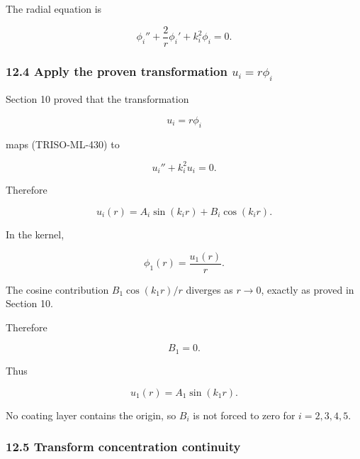 \documentclass[11pt,a4paper]{article}
\begin{document}
The radial equation is

\begin{equation}
\boxed{
\phi_i''
+\frac2r\phi_i'
+k_i^2\phi_i
=
0.
}
\tag{TRISO-ML-430}
\label{eq:triso-ml-430}
\end{equation}

\subsubsection*{12.4 Apply the proven transformation $u_i=r\phi_i$}

Section 10 proved that the transformation

\begin{equation}
u_i=r\phi_i
\tag{TRISO-ML-431}
\label{eq:triso-ml-431}
\end{equation}

maps (TRISO-ML-430) to

\begin{equation}
\boxed{
u_i''+k_i^2u_i=0.
}
\tag{TRISO-ML-432}
\label{eq:triso-ml-432}
\end{equation}

Therefore

\begin{equation}
\boxed{
u_i(r)
=
A_i\sin(k_ir)+B_i\cos(k_ir).
}
\tag{TRISO-ML-433}
\label{eq:triso-ml-433}
\end{equation}

In the kernel,

\begin{equation}
\phi_1(r)=\frac{u_1(r)}{r}.
\tag{TRISO-ML-434}
\label{eq:triso-ml-434}
\end{equation}

The cosine contribution $B_1\cos(k_1r)/r$ diverges as $r\to0$, exactly as proved in Section 10.

Therefore

\begin{equation}
\boxed{
B_1=0.
}
\tag{TRISO-ML-435}
\label{eq:triso-ml-435}
\end{equation}

Thus

\begin{equation}
u_1(r)=A_1\sin(k_1r).
\tag{TRISO-ML-436}
\label{eq:triso-ml-436}
\end{equation}

No coating layer contains the origin, so $B_i$ is not forced to zero for $i=2,3,4,5$.

\subsubsection*{12.5 Transform concentration continuity}
\end{document}
